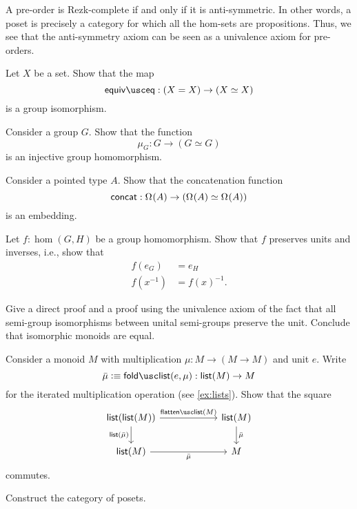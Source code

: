 \begin{eg}
  A pre-order is Rezk-complete if and only if it is anti-symmetric. In other words, a poset is precisely a category for which all the hom-sets are propositions. Thus, we see that the anti-symmetry axiom can be seen as a univalence axiom for pre-orders.
\end{eg}

\begin{exercises}
\item Let $X$ be a set. Show that the map
  \begin{equation*}
    \equiveq : (X=X)\to (\eqv{X}{X})
  \end{equation*}
  is a group isomorphism.
\item \label{ex:groupop-embedding}
  \begin{subexenum}
  \item Consider a group $G$. Show that the function
    \begin{equation*}
      \mu_G:G\to (G\simeq G)
    \end{equation*}
    is an injective group homomorphism.
  \item Consider a pointed type $A$. Show that the concatenation function
    \begin{equation*}
      \mathsf{concat}:\Omega^{}(A)\to (\Omega^{}(A)\simeq\Omega^{}(A))
    \end{equation*}
    is an embedding.
  \end{subexenum}
\item Let $f:\hom(G,H)$ be a group homomorphism. Show that $f$ preserves units and inverses, i.e., show that
  \begin{align*}
    f(e_G) & = e_H \\
    f(x^{-1}) & = f(x)^{-1}.
  \end{align*}
\item Give a direct proof and a proof using the univalence axiom of the fact that all semi-group isomorphisms between unital semi-groups preserve the unit. Conclude that isomorphic monoids are equal.
\item Consider a monoid $M$ with multiplication $\mu:M\to (M\to M)$ and unit $e$. Write
  \begin{equation*}
    \bar{\mu}\defeq\foldlist(e,\mu):\lst(M)\to M
  \end{equation*}
  for the iterated multiplication operation (see \cref{ex:lists}). Show that the square
  \begin{equation*}
    \begin{tikzcd}[column sep=6em]
      \lst(\lst(M)) \arrow[r,"\flattenlist(M)"] \arrow[d,swap,"\lst(\bar{\mu})"] & \lst(M) \arrow[d,"\bar{\mu}"] \\
        \lst(M) \arrow[r,swap,"\bar{\mu}"] & M
    \end{tikzcd}
  \end{equation*}
  commutes. 
\item Construct the category of posets.
\end{exercises}
